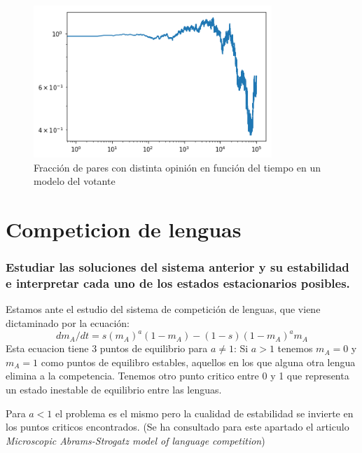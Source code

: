 \begin{figure}
	\centering
	\includegraphics[width=9cm]{barra_frac}
	\caption{Fracción de pares con distinta opinión en función del tiempo en un modelo del votante}
	\label{6}
\end{figure}

\section{Competicion de lenguas}
\subsubsection{\large Estudiar las soluciones del sistema anterior y su estabilidad e interpretar cada uno de los estados estacionarios posibles.} 

Estamos ante el estudio del sistema de competición de lenguas, que viene dictaminado por la ecuación:
$$dm_A/dt=s(m_A)^a(1-m_A)-(1-s)(1-m_A)^am_A$$
Esta ecuacion tiene 3 puntos de equilibrio para $a\neq1$:
Si $a>1$ tenemos $m_A=0$ y $m_A=1$ como puntos de equilibro estables, aquellos en los que alguna otra lengua elimina a la competencia. Tenemos otro punto critico entre 0 y 1 que representa un estado inestable de equilibrio entre las lenguas.

Para $a<1$ el problema es el mismo pero la cualidad de estabilidad se invierte en los puntos criticos encontrados.
(Se ha consultado para este apartado el articulo \textit{Microscopic Abrams-Strogatz model of language competition})
